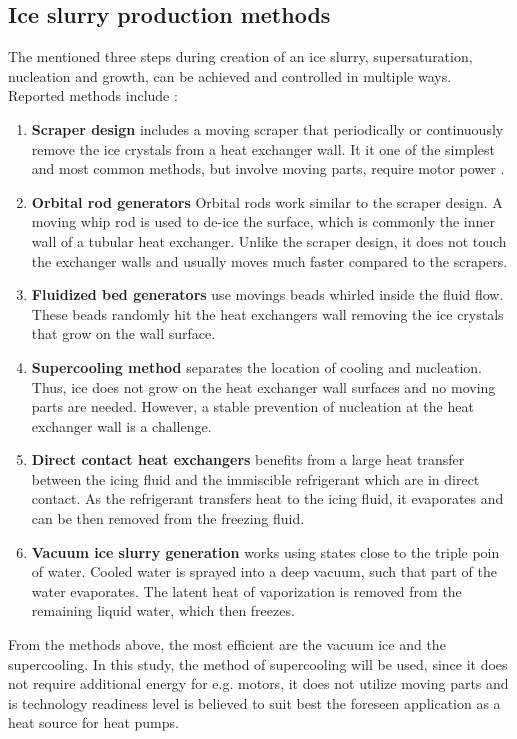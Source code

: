 \subsection{Ice slurry production methods}

The mentioned three steps during creation of an ice slurry, supersaturation, nucleation and growth, can be achieved and controlled in multiple ways. Reported methods include \citep{kauffeld_handbooks_2005, zhang_overview_2012, mouneer_heat_2010}:
\begin{enumerate}
  \item \textbf{Scraper design} includes a moving scraper that periodically or continuously remove the ice crystals from a heat exchanger wall. It it one of the simplest and most common methods, but involve moving parts, require motor power \citep{ernst_influence_2016}. 
  \item \textbf{Orbital rod generators}
    Orbital rods work similar to the scraper design. A moving whip rod is used to de-ice the surface, which is commonly the inner wall of a tubular heat exchanger. Unlike the scraper design, it does not touch the exchanger walls and usually moves much faster compared to the scrapers.
  \item \textbf{Fluidized bed generators}
    use movings beads whirled inside the fluid flow. These beads randomly hit the heat exchangers wall removing the ice crystals that grow on the wall surface.
  \item \textbf{Supercooling method} separates the location of cooling and nucleation. Thus, ice does not grow on the heat exchanger wall surfaces and no moving parts are needed. However, a stable prevention of nucleation at the heat exchanger wall is a challenge.
  \item \textbf{Direct contact heat exchangers} benefits from a large heat transfer between the icing fluid and the immiscible refrigerant which are in direct contact. As the refrigerant transfers heat to the icing fluid, it evaporates and can be then removed from the freezing fluid.
  \item \textbf{Vacuum ice slurry generation} works using states close to the triple poin of water. Cooled water is sprayed into a deep vacuum, such that part of the water evaporates. The latent heat of vaporization is removed from the remaining liquid water, which then freezes. 
\end{enumerate}

From the methods above, the most efficient are the vacuum ice and the supercooling. In this study, the method of supercooling will be used, since it does not require additional energy for e.g. motors, it does not utilize moving parts and is technology readiness level is believed to suit best the foreseen application as a heat source for heat pumps.


